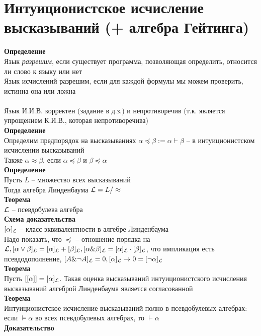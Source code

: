 \documentclass[12pt]{article}
\begin{document}
\section{Интуиционистское исчисление высказываний (+ алгебра Гейтинга)}
\textbf{Определение}\\
Язык \textit{разрешим}, если существует программа, позволяющая определить, относится ли слово к языку или нет\\
Язык исчислений разрешим, если для каждой формулы мы можем проверить, истинна она или ложна\\\\
Язык И.И.В. корректен (задание в д.з.) и непротиворечив (т.к. является упрощением К.И.В., которая непротиворечива)\\
\textbf{Определение}\\
Определим предпорядок на высказываниях $\alpha \preceq \beta := \alpha \vdash \beta$ -- в интуиционистском исчислении высказываний\\
Также $\alpha \approx \beta$, если $\alpha \preceq \beta$ и $\beta \preceq \alpha$\\
\textbf{Определение}\\
Пусть $L$ -- множество всех высказываний\\
Тогда алгебра Линденбаума $\mathcal L = L / \approx$\\
\textbf{Теорема}\\
$\mathcal L$ -- псевдобулева алгебра\\
\textbf{Схема доказательства}\\
$[\alpha]_{\mathcal L}$ -- класс эквивалентности в алгебре Линденбаума\\
Надо показать, что $\preceq$ -- отношение порядка на $\mathcal L, [\alpha \lor \beta]_{\mathcal L} = [\alpha]_{\mathcal L} + [\beta]_{\mathcal L}, [\alpha \& \beta]_{\mathcal L} = [\alpha]_{\mathcal L} \cdot [\beta]_{\mathcal L}$, что импликация есть псевдодополнение, $[A \& \lnot A]_{\mathcal L} = 0, [\alpha]_{\mathcal L} \rightarrow 0 = [\lnot \alpha]_{\mathcal L}$\\
\textbf{Теорема}\\
Пусть $[[\alpha]] = [\alpha]_{\mathcal L}$. Такая оценка высказываний интуиционистского исчисления высказываний алгеброй Линденбаума является согласованной\\
\textbf{Теорема}\\
Интуиционистское исчисление высказываний полно в псевдобулевых алгебрах: если $\models \alpha$ во всех псевдобулевых алгебрах, то $\vdash \alpha$\\
\textbf{Доказательство}\\
\end{document}
